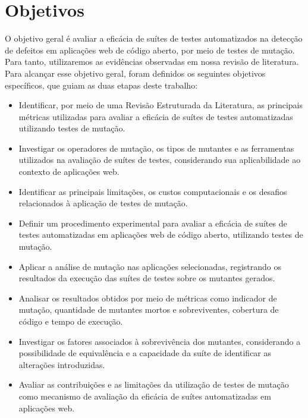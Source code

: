 \section{Objetivos}

O objetivo geral é avaliar a eficácia de suítes de testes automatizados na detecção de defeitos em aplicações web de código aberto, por meio de testes de mutação. Para tanto, utilizaremos as evidências  observadas em nossa revisão de literatura.
Para alcançar esse objetivo geral, foram definidos os seguintes objetivos específicos, que guiam as duas etapas deste trabalho:
\begin{itemize}

    \item Identificar, por meio de uma  Revisão Estruturada da Literatura, as principais métricas utilizadas para avaliar a eficácia de suítes de testes automatizadas utilizando testes de mutação.
    


    \item Investigar os operadores de mutação, os tipos de mutantes e as ferramentas utilizados na avaliação de suítes de testes, considerando sua aplicabilidade ao contexto de aplicações web.
    
    \item Identificar as principais limitações, os custos computacionais e os desafios relacionados à aplicação de testes de mutação.
    
    \item Definir um procedimento experimental para avaliar a eficácia de suítes de testes automatizadas em aplicações web de código aberto, utilizando testes de mutação.
    
    \item Aplicar a análise de mutação nas aplicações selecionadas, registrando os resultados da execução das suítes de testes sobre os mutantes gerados.
    
    \item Analisar os resultados obtidos por meio de métricas como indicador de mutação, quantidade de mutantes mortos e sobreviventes, cobertura de código e tempo de execução.
    
    \item Investigar os fatores associados à sobrevivência dos mutantes, considerando a possibilidade de equivalência e a capacidade da suíte de identificar as alterações introduzidas.
    
    \item Avaliar as contribuições e as limitações da utilização de testes de mutação como mecanismo de avaliação da eficácia de suítes automatizadas em aplicações web.
 
\end{itemize}


